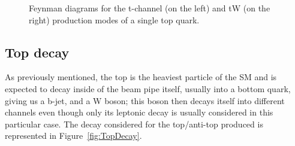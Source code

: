 \documentclass[a4paper, 10pt, openright]{report}
\begin{document}
\begin{figure}[htbp]
\centering
\begin{minipage}[b]{.34\textwidth}
\end{minipage} 
\begin{minipage}[b]{.34\textwidth}
\end{minipage} 
\caption{Feynman diagrams for the t-channel (on the left) and tW (on the right) production modes of a single top quark.}
\label{fig:singleTopOtherChann}
\end{figure}

\subsection{Top decay} \label{subsection:topDecay}

As previously mentioned, the top is the heaviest particle of the \ac{SM} and is expected to decay inside of the beam pipe itself, usually into a bottom quark, giving us a b-jet, and a W boson; this boson then decays itself into different channels even though only its leptonic decay is usually considered in this particular case. The decay considered for the top/anti-top produced is represented in Figure~\ref{fig:TopDecay}.
\end{document}
